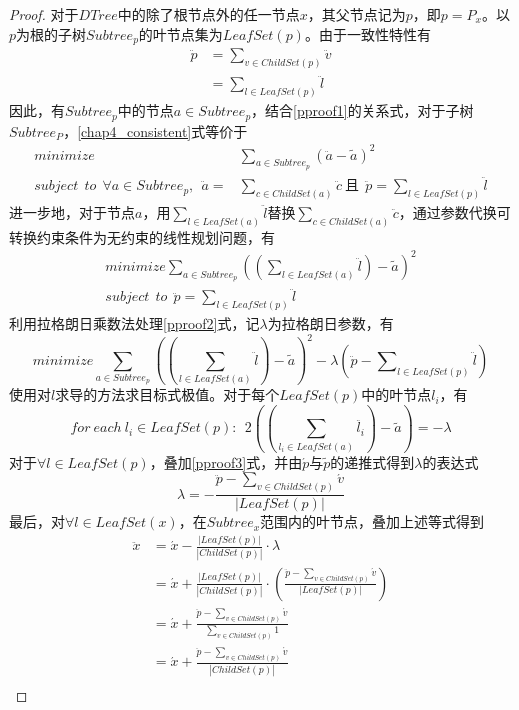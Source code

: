 \begin{proof}
	对于$DTree$中的除了根节点外的任一节点$x$，其父节点记为$p$，即$p = P_{x}$。以$p$为根的子树$Subtree_{p}$的叶节点集为$LeafSet(p)$。由于一致性特性有
	\begin{equation}
	\label{pproof1}
	\begin{split}
	\ddot{p} &= \sum\nolimits_{v \in ChildSet(p)} {\ddot{v}}\\
	&= \sum\nolimits_{l \in LeafSet(p)} {\ddot{l}} 
	\end{split}
	\end{equation}
	因此，有$Subtree_{p}$中的节点$a \in Subtree_{p}$，结合\ref{pproof1}的关系式，对于子树$Subtree_{P}$，\ref{chap4_consistent}式等价于
	\[
	\begin{split}
	minimize &\sum\limits_{a \in Subtree_{p}} (\ddot{a} - \tilde{a})^2 \\
	subject\ \ to\ \ \forall a\in Subtree_{p},\ \ \ddot{a} = &\sum\limits_{c \in ChildSet(a)} \ddot{c}\ \text{且}\ \ \ddot{p} = \sum\nolimits_{l \in LeafSet(p)} {\ddot{l}} 
	\end{split}		
	\]
	进一步地，对于节点$a$，用$\sum\limits_{l \in LeafSet(a)} \ddot{l}$替换$\sum\limits_{c \in ChildSet(a)} \ddot{c}$，通过参数代换可转换约束条件为无约束的线性规划问题，有
	\begin{equation}
	\label{pproof2}
	\begin{split}
	minimize \sum\limits_{a \in Subtree_{p}} ((\sum\limits_{l \in LeafSet(a)} \ddot{l}) - \tilde{a})^2\\
	subject\ \ to\ \ \ddot{p} = \sum\nolimits_{l \in LeafSet(p)} {\ddot{l}} 
	\end{split}		
	\end{equation}
	利用拉格朗日乘数法\supercite{lagrange}处理\ref{pproof2}式，记$\lambda$为拉格朗日参数，有
	\[
	minimize \sum\limits_{a \in Subtree_{p}} ((\sum\limits_{l \in LeafSet(a)} \ddot{l}) - \tilde{a})^2 - \lambda(\ddot{p} - \sum\nolimits_{l \in LeafSet(p)} {\ddot{l}})
	\]
	使用对$l$求导的方法求目标式极值。对于每个$LeafSet(p)$中的叶节点$l_{i}$，有
	\begin{equation}
	\label{pproof3}
	for\ each\  l_{i} \in LeafSet(p):\ \ 2((\sum\limits_{l_{i} \in LeafSet(a)} \ddot{l_{i}}) - \tilde{a}) = -\lambda 
	\end{equation}
	对于$\forall l \in LeafSet(p)$，叠加\ref{pproof3}式，并由$\acute{p}$与$\tilde{p}$的递推式得到$\lambda$的表达式
	\[
	\lambda = -\frac{\ddot{p}-\sum\nolimits_{v \in ChildSet(p)} {\acute{v}}}{|LeafSet(p)|}
	\]
	最后，对$\forall l \in LeafSet(x)$，在$Subtree_{x}$范围内的叶节点，叠加上述等式得到
	\[
	\begin{split}
	\ddot{x} &= \acute{x} - \frac{|LeafSet(p)|}{|ChildSet(p)|}\cdotp \lambda \\
	&= \acute{x} + \frac{|LeafSet(p)|}{|ChildSet(p)|}\cdotp (\frac{\ddot{p}-\sum\nolimits_{v \in ChildSet(p)}{\acute{v}}}{|LeafSet(p)|})\\
	&= \acute{x} + \frac{{\ddot{p} - \sum\nolimits_{v \in ChildSet(p)} {\acute{v}}}}{\sum\nolimits_{v \in ChildSet(p)} {1}}\\
	&= \acute{x} + \frac{\ddot{p} - \sum\nolimits_{v \in ChildSet(p)}{\acute{v}}}{|ChildSet(p)|}\\
	\end{split}
	\]
	

\end{proof}
